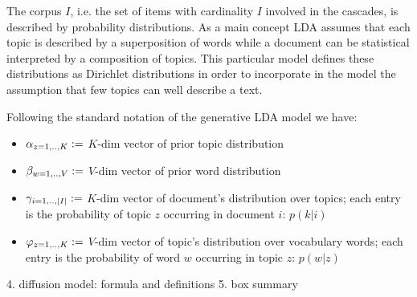 The corpus $I$, i.e. the set of items with cardinality $I$ involved in the cascades, is described by probability distributions. As a main concept LDA assumes that each topic is described by a superposition of words while a document can be statistical interpreted by a composition of topics. This particular model defines these distributions as Dirichlet distributions in order to incorporate in the model the assumption that few topics can well describe a text.

Following the standard notation of the generative LDA model we have:
\begin{itemize}
\item $\bold{\alpha}_{z=1,..,K}:=$ $K$-dim vector of prior topic distribution
\item $\bold{\beta}_{w=1,..,V}:=$ $V$-dim vector of prior word distribution
\item $\bold{\gamma}_{i=1,..,|I|}:=$ $K$-dim vector of document's distribution over topics; each entry is the probability of topic $z$ occurring in document $i$: $p(k|i)$
\item $\bold{\varphi}_{z=1,..,K}:=$ $V$-dim vector of topic's distribution over vocabulary words; each entry is the probability of word $w$ occurring in topic $z$: $p(w|z)$ 
\end{itemize} 


4. diffusion model: formula and definitions
5. box summary